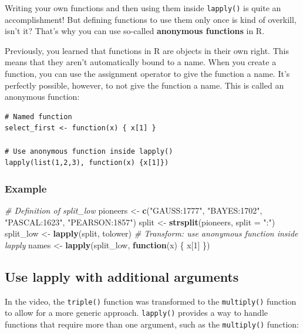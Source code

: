 \documentclass[
]{book}
\newenvironment{Shaded}{\begin{snugshade}}{\end{snugshade}}
\newcommand{\CommentTok}[1]{\textcolor[rgb]{0.56,0.35,0.01}{\textit{#1}}}
\newcommand{\ControlFlowTok}[1]{\textcolor[rgb]{0.13,0.29,0.53}{\textbf{#1}}}
\newcommand{\DataTypeTok}[1]{\textcolor[rgb]{0.13,0.29,0.53}{#1}}
\newcommand{\DecValTok}[1]{\textcolor[rgb]{0.00,0.00,0.81}{#1}}
\newcommand{\KeywordTok}[1]{\textcolor[rgb]{0.13,0.29,0.53}{\textbf{#1}}}
\newcommand{\NormalTok}[1]{#1}
\newcommand{\StringTok}[1]{\textcolor[rgb]{0.31,0.60,0.02}{#1}}
\begin{document}
Writing your own functions and then using them inside \texttt{lapply()} is quite an accomplishment! But defining functions to use them only once is kind of overkill, isn't it? That's why you can use so-called \textbf{anonymous functions} in R.

Previously, you learned that functions in R are objects in their own right. This means that they aren't automatically bound to a name. When you create a function, you can use the assignment operator to give the function a name. It's perfectly possible, however, to not give the function a name. This is called an anonymous function:

\begin{verbatim}
# Named function
select_first <- function(x) { x[1] }

# Use anonymous function inside lapply()
lapply(list(1,2,3), function(x) {x[1]})
\end{verbatim}

\hypertarget{example-2}{%
\subsubsection{Example}\label{example-2}}

\begin{Shaded}
\begin{Highlighting}[]
\CommentTok{# Definition of split_low}
\NormalTok{pioneers <-}\StringTok{ }\KeywordTok{c}\NormalTok{(}\StringTok{"GAUSS:1777"}\NormalTok{, }\StringTok{"BAYES:1702"}\NormalTok{, }\StringTok{"PASCAL:1623"}\NormalTok{, }\StringTok{"PEARSON:1857"}\NormalTok{)}
\NormalTok{split <-}\StringTok{ }\KeywordTok{strsplit}\NormalTok{(pioneers, }\DataTypeTok{split =} \StringTok{":"}\NormalTok{)}
\NormalTok{split_low <-}\StringTok{ }\KeywordTok{lapply}\NormalTok{(split, tolower)}
\CommentTok{# Transform: use anonymous function inside lapply}
\NormalTok{names <-}\StringTok{ }\KeywordTok{lapply}\NormalTok{(split_low, }\ControlFlowTok{function}\NormalTok{(x) \{ x[}\DecValTok{1}\NormalTok{] \})}
\end{Highlighting}
\end{Shaded}

\hypertarget{use-lapply-with-additional-arguments}{%
\subsection{Use lapply with additional arguments}\label{use-lapply-with-additional-arguments}}

In the video, the \texttt{triple()} function was transformed to the \texttt{multiply()} function to allow for a more generic approach. \texttt{lapply()} provides a way to handle functions that require more than one argument, such as the \texttt{multiply()} function:
\end{document}
